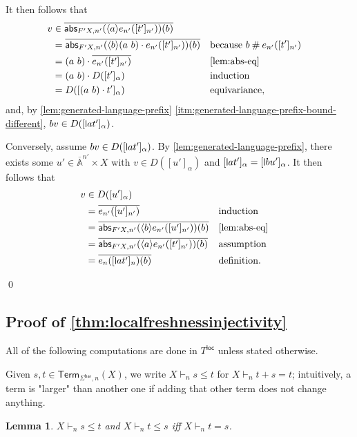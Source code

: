 \documentclass[11pt,a4paper]{amsart}
\newtheorem{lemma}[lemma]{Lemma}
\newcommand{\Br}{\mathsf{bar}}
\newcommand{\abs}{\mathsf{abs}}
\newcommand{\Term}{\mathsf{Term}}
\newcommand{\loc}{\mathsf{loc}}
\newcommand{\Names}{\mathbb{A}}
\newcommand{\barNames}{\overline{\Names}}
\newcommand{\fresh}{\mathbin{\#}}
\newcommand{\bind}[1]{\langle #1\rangle}
\theoremstyle{plain}
\newcommand{\midmid}{\hspace{0.2ex}{\rule[-0.1ex]{0.6pt}{1.65ex}}\hspace{0.2ex}}
\newcommand{\newletter}[1]{{\midmid}#1}
\numberwithin{equation}{section}
\newcommand{\+}[1]{\mathcal{#1}\xspace}
\theoremstyle{definition}
\begin{document}
\begin{itemize}
    It then follows that
    \begin{align*}
      v &\in \overline{\abs_{F'X, n'}(\bind{a} e_{n'}([t']_{n'}))(b)} \\
      &= \overline{\abs_{F'X, n'}(\bind{b}(a\ b) \cdot e_{n'}([t']_{n'}))(b)} && \text{because } b \fresh e_{n'}([t']_{n'})  \\
      &= (a\ b) \cdot \overline{e_{n'}([t']_{n'})} && \text{\cref{lem:abs-eq}} \\
      &= (a\ b) \cdot D([t']_\alpha) && \text{induction} \\
      &= D([(a\ b) \cdot t']_\alpha) && \text{equivariance},
    \end{align*}
    and, by \cref{lem:generated-language-prefix} \eqref{itm:generated-language-prefix-bound-different}, \(bv \in D([\newletter{a}t']_\alpha)\).

    Conversely, assume \(bv \in D([\newletter{a}t']_\alpha)\).
    By \cref{lem:generated-language-prefix}, there exists some \(u' \in \barNames^{n'} \times X\) with \(v \in D([u']_\alpha)\) and \([\newletter{a}t']_\alpha = [\newletter{b}u']_\alpha\).
    It then follows that
    \begin{align*}
      v &\in D([u']_\alpha) \\
      &= \overline{e_{n'}([u']_{n'})} && \text{induction} \\
      &= \overline{\abs_{F'X, n'}(\bind{b} e_{n'}([u']_{n'}))(b)} && \text{\cref{lem:abs-eq}} \\
      &= \overline{\abs_{F'X, n'}(\bind{a} e_{n'}([t']_{n'}))(b)} && \text{assumption} \\
      &= \overline{e_n([\newletter{a}t']_n)(b)} && \text{definition}.
    \end{align*}
\end{itemize}\qed

\subsection*{Proof of \cref{thm:localfreshnessinjectivity}}

All of the following computations are done in \(T^\loc\) unless stated otherwise.

Given \(s, t \in \Term_{\Sigma^\Br, n}(X)\), we write \(X \vdash_n s \le t\) for \(X \vdash_n t + s = t\); intuitively, a term is "larger" than another one if adding that other term does not change anything.

\begin{lemma}\label{lem:derivable-inequality-equal}
  \(X \vdash_n s \le t\) and \(X \vdash_n t \le s\) iff \(X \vdash_n t = s\).
\end{lemma}
\end{document}
